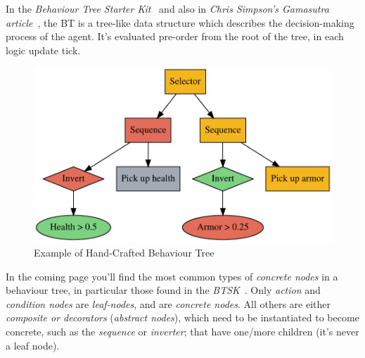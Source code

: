 \documentclass[a4paper, twocolumn]{article}
\begin{document}
        In the \emph{Behaviour Tree Starter Kit}~\cite{champandard2014behaviour} and also in \emph{Chris Simpson's Gamasutra article}~\cite{simpson2014behavior}, the BT is a tree-like data structure which describes the decision-making process of the agent. It's evaluated pre-order from the root of the tree, in each logic update tick.

        \begin{figure}[H]
            \centering
            \includegraphics[width=\linewidth]{share/behaviour_tree.pdf}
            \caption{Example of Hand-Crafted Behaviour Tree}
            \label{fig:behaviour_tree}
        \end{figure}

        In the coming page you'll find the most common types of \emph{concrete nodes} in a behaviour tree, in particular those found in the \emph{BTSK}~\cite{champandard2014behaviour}. Only \emph{action} and \emph{condition nodes} are \emph{leaf-nodes}, and are \emph{concrete nodes}. All others are either \emph{composite or decorators} (\emph{abstract nodes}), which need to be instantiated to become concrete, such as the \emph{sequence} or \emph{inverter}; that have one/more children (it's never a leaf node).
\end{document}
